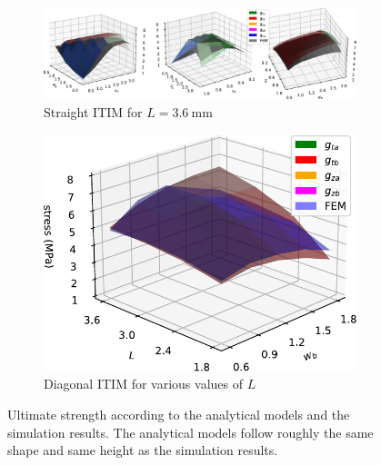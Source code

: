 \begin{figure}
	\centering
	\setlength{\figheight}{.2\textwidth}
	\begin{subfigure}[B]{.7\textwidth}
		\centering
		\includegraphics[height=\figheight]{sources/simulation/model_accuracy.pdf}
		\caption{Straight ITIM for $L=\SI{3.6}{\milli\meter}$}
		\label{fig:ana_sim_accuracy_straight}
	\end{subfigure}
	\hspace{-.5cm}
	\begin{subfigure}[B]{.29\textwidth}
		\centering
		\includegraphics[height=\figheight]{sources/simulation/model_accuracy_diagonal.pdf}
		\caption{Diagonal ITIM for various values of $L$}
		\label{fig:ana_sim_accuracy_diagonal}
	\end{subfigure}
	\caption{Ultimate strength according to the analytical models and the simulation results. The analytical models follow roughly the same shape and same height as the simulation results. }
	\label{fig:ana_sim_accuracy}
\end{figure}






